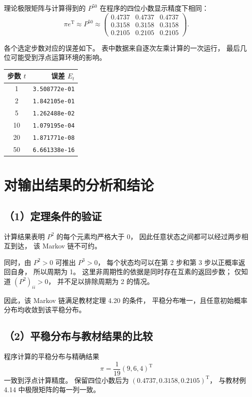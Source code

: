 \documentclass[UTF8,a4paper,11pt,fontset=fandol]{ctexart}
\begin{document}
理论极限矩阵与计算得到的 $P^{50}$
在程序的四位小数显示精度下相同：
\[
\pi e^{\mathrm T}\approx P^{50}\approx
\begin{pmatrix}
0.4737&0.4737&0.4737\\
0.3158&0.3158&0.3158\\
0.2105&0.2105&0.2105
\end{pmatrix}.
\]

各个选定步数对应的误差如下。
表中数据来自逐次左乘计算的一次运行，
最后几位可能受到浮点运算环境的影响。

\begin{center}
\begin{tabular}{cr}
\toprule
步数 $t$ & 误差 $E_t$\\
\midrule
1  & \texttt{3.508772e-01}\\
2  & \texttt{1.842105e-01}\\
5  & \texttt{1.262488e-02}\\
10 & \texttt{1.079195e-04}\\
20 & \texttt{1.871771e-08}\\
50 & \texttt{6.661338e-16}\\
\bottomrule
\end{tabular}
\end{center}

\section{对输出结果的分析和结论}

\subsection*{（1）定理条件的验证}

计算结果表明 $P^2$ 的每个元素均严格大于 0，
因此任意状态之间都可以经过两步相互到达，
该 Markov 链不可约。

同时，由 $P^2>0$ 可推出 $P^3>0$，
每个状态均可以在第 2 步和第 3 步以正概率返回自身，
所以周期为 1。
这里非周期性的依据是同时存在互素的返回步数；
仅知道 $(P^2)_{ii}>0$，
并不足以排除周期为 2 的情况。

因此，该 Markov 链满足教材定理 4.20 的条件，
平稳分布唯一，且任意初始概率分布均收敛到该平稳分布。

\subsection*{（2）平稳分布与教材结果的比较}

程序计算的平稳分布与精确结果
\[
\pi=\frac1{19}(9,6,4)^{\mathrm T}
\]
一致到浮点计算精度。
保留四位小数后为
$(0.4737,0.3158,0.2105)^{\mathrm T}$，
与教材例 4.14 中极限矩阵的每一列一致。
\end{document}
